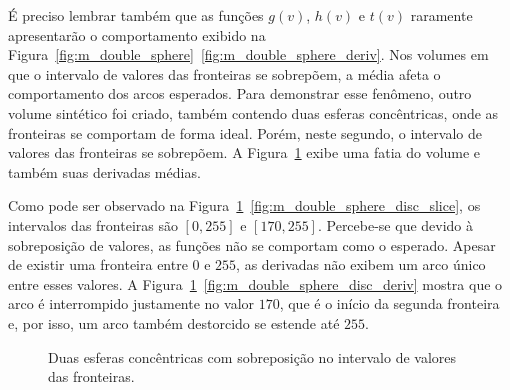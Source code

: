 	É preciso lembrar também que as funções $ g(v) $, $ h(v) $ e $ t(v) $ raramente apresentarão o comportamento exibido na Figura~\ref{fig:m_double_sphere}~\ref{fig:m_double_sphere_deriv}. Nos volumes em que o intervalo de valores das fronteiras se sobrepõem, a média afeta o comportamento dos arcos esperados. Para demonstrar esse fenômeno, outro volume sintético foi criado, também contendo duas esferas concêntricas, onde as fronteiras se comportam de forma ideal. Porém, neste segundo, o intervalo de valores das fronteiras se sobrepõem. A Figura~\ref{fig:m_double_sphere_disc} exibe uma fatia do volume e também suas derivadas médias.
	
	Como pode ser observado na Figura~\ref{fig:m_double_sphere_disc}~\ref{fig:m_double_sphere_disc_slice}, os intervalos das fronteiras são $ [0,255] $ e $ [170,255] $. Percebe-se que devido à sobreposição de valores, as funções não se comportam como o esperado. Apesar de existir uma fronteira entre $ 0 $ e $ 255 $, as derivadas não exibem um arco único entre esses valores. A Figura~\ref{fig:m_double_sphere_disc}~\ref{fig:m_double_sphere_disc_deriv} mostra que o arco é interrompido justamente no valor $ 170 $, que é o início da segunda fronteira e, por isso, um arco também destorcido se estende até $ 255 $.	
	
\begin{figure}[h]
	\centering
	\caption{Duas esferas concêntricas com sobreposição no intervalo de valores das fronteiras.}
	\label{fig:m_double_sphere_disc}
\end{figure}
	
